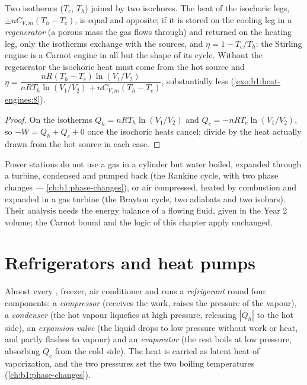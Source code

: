 \begin{proposition}\label{prop:b1:heat-engines:stirling}
Two isotherms ($T_c$, $T_h$) joined by two isochores. The heat of the
isochoric legs, $\pm nC_{V,m}(T_h - T_c)$, is equal and opposite; if it
is stored on the cooling leg in a \emph{regenerator} (a porous mass the
gas flows through) and returned on the heating leg, only the isotherms
exchange with the sources, and $\eta = 1 - T_c/T_h$: the Stirling engine
is a Carnot engine in all but the shape of its cycle. Without the
regenerator the isochoric heat must come from the hot source and
$\eta = \dfrac{nR(T_h - T_c)\ln(V_1/V_2)}{nRT_h\ln(V_1/V_2) + nC_{V,m}(T_h - T_c)}$,
substantially less (\cref{exo:b1:heat-engines:8}).
\end{proposition}

\begin{proof}
On the isotherms $Q_h = nRT_h\ln(V_1/V_2)$ and $Q_c = -nRT_c\ln(V_1/V_2)$, so
$-W = Q_h + Q_c + 0$ once the isochoric heats cancel; divide by the heat
actually drawn from the hot source in each case.
\end{proof}

\begin{remark}\label{rem:b1:heat-engines:turbines}
Power stations do not use a gas in a cylinder but water boiled,
expanded through a turbine, condensed and pumped back (the Rankine
cycle, with two phase changes --- \cref{ch:b1:phase-changes}), or air
compressed, heated by combustion and expanded in a gas turbine (the
Brayton cycle, two adiabats and two isobars). Their analysis needs the
energy balance of a flowing fluid, given in the Year 2 volume; the
Carnot bound and the logic of this chapter apply unchanged.
\end{remark}

\section{Refrigerators and heat pumps}

\begin{definition}\label{def:b1:heat-engines:vapourcycle}
Almost every , freezer, air conditioner and  runs
a \emph{refrigerant} round four components: a \emph{compressor}
(receives the work, raises the pressure of the vapour), a
\emph{condenser} (the hot vapour liquefies at high pressure, releasing
$|Q_h|$ to the hot side), an \emph{expansion valve} (the liquid drops to
low pressure without work or heat, and partly flashes to vapour) and an
\emph{evaporator} (the rest boils at low pressure, absorbing $Q_c$ from
the cold side). The heat is carried as latent heat of vaporization, and
the two pressures set the two boiling temperatures
(\cref{ch:b1:phase-changes}).
\end{definition}

